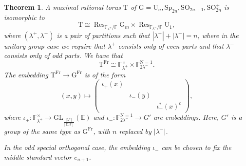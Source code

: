 \documentclass[12pt, reqno]{amsart}
\newtheorem{theorem}{Theorem}[section]
\theoremstyle{definition}
\theoremstyle{definition}
\theoremstyle{definition}
\newcommand{\multiplicativegroup}[1]{#1^{\times}}
\newcommand{\sizeof}[1]{\left|#1\right|}
\newcommand{\grpIndex}[2]{\left[#1:#2\right]}
\newcommand{\involution}[1]{#1^{c}}
\newcommand{\GL}{\mathrm{GL}}
\newcommand{\SO}{\mathrm{SO}}
\newcommand{\Sp}{\mathrm{Sp}}
\newcommand{\UnitaryGroup}{\mathrm{U}}
\newcommand{\aFieldNorm}{\mathrm{N}}
\newcommand{\finiteField}{\mathbb{F}}
\newcommand{\quadraticExtension}{\mathbb{E}}
\newcommand{\finiteFieldExtension}[1]{\finiteField_{#1}}
\newcommand{\NormOneGroup}[1]{\finiteFieldExtension{#1}^{\aFieldNorm = 1}}
\newcommand{\Frobenius}{\operatorname{Fr}}
\newcommand{\restrictionOfScalars}[3]{\operatorname{Res}_{#1 \slash #2}{#3}}
\newcommand{\multiplcativeScheme}{\algebraicGroup{G}_m}
\newcommand{\algebraicGroup}[1]{\boldsymbol{\mathrm{#1}}}
\begin{document}
	\begin{theorem}
		A maximal rational torus $\algebraicGroup{T}$ of $\algebraicGroup{G} = \algebraicGroup{\UnitaryGroup}_{n}, \algebraicGroup{\Sp}_{2n}, \algebraicGroup{\SO}_{2n + 1}, \algebraicGroup{\SO}_{2n}^{\pm}$ is isomorphic to 	$$\algebraicGroup{T} \cong \restrictionOfScalars{\finiteFieldExtension{\lambda^{+}}}{\finiteField}{\multiplcativeScheme} \times \restrictionOfScalars{\finiteFieldExtension{\lambda^{-}}}{\finiteField}{\algebraicGroup{\UnitaryGroup}_1},$$
		where $\left(\lambda^+, \lambda^-\right)$ is a pair of partitions such that $\sizeof{\lambda^+} + \sizeof{\lambda^-} = n$, where in the unitary group case we require that $\lambda^+$ consists only of even parts and that $\lambda^-$ consists only of odd parts. We have that $$\algebraicGroup{T}^{\Frobenius} \cong \multiplicativegroup{\finiteFieldExtension{\lambda^+}} \times \NormOneGroup{2 \lambda^{-}}.$$ The embedding $\algebraicGroup{T}^{\Frobenius} \to \algebraicGroup{G}^{\Frobenius}$ is of the form $$\left(x, y\right) \mapsto
		\begin{pmatrix}
			\iota_+\left(x\right)\\
			& \iota_{-}\left(y\right) &\\
			 & & \involution{\iota_+^{\ast}\left(x\right)}
		\end{pmatrix},$$
		where $\iota_+ \colon \multiplicativegroup{\finiteFieldExtension{\lambda^+}} \to \GL_{\frac{\sizeof{\lambda^+}}{\grpIndex{\quadraticExtension}{\finiteField}}}\left(\quadraticExtension\right)$ and $\iota_- \colon \NormOneGroup{2 \lambda^{-}} \to G'$ are embeddings. Here, $G'$ is a group of the same type as $\algebraicGroup{G}^{\Frobenius}$, with $n$ replaced by $\sizeof{\lambda^{-}}$.
		
		In the odd special orthogonal case, the embedding $\iota_{-}$ can be chosen to fix the middle standard vector $e_{n+1}$.
	\end{theorem}
    
\end{document}
